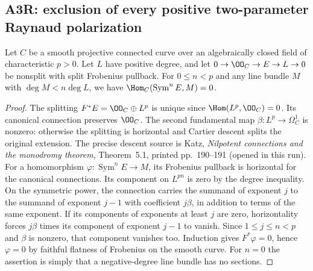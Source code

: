 \subsection{A3R: exclusion of every positive two-parameter Raynaud polarization}
\begin{lemma}\label{a:connection-bound}
Let $C$ be a smooth projective connected curve over an algebraically closed
field of characteristic $p>0$. Let $L$ have positive degree, and let
$0\to\OO_C\to E\to L\to0$ be nonsplit with split Frobenius pullback.
For $0\leq n<p$ and any line bundle $M$ with
$\deg M<n\deg L$, we have $\Hom_C(\operatorname{Sym}^n E,M)=0$.
\end{lemma}
\begin{proof}
The splitting $F^*E=\OO_C\oplus L^p$ is unique since
$\Hom(L^p,\OO_C)=0$. Its canonical connection preserves $\OO_C$.
The second fundamental map $\beta:L^p\to\Omega_C^1$ is nonzero:
otherwise the splitting is horizontal and Cartier descent splits the
original extension. The precise descent source is Katz, \emph{Nilpotent
connections and the monodromy theorem}, Theorem~5.1, printed pp.~190--191 (opened in this run).
For a homomorphism $\varphi:\operatorname{Sym}^nE\to M$, its Frobenius
pullback is horizontal for the canonical connections. Its component on
$L^{pn}$ is zero by the degree inequality. On the symmetric power, the
connection carries the summand of exponent $j$ to the summand of exponent
$j-1$ with coefficient $j\beta$, in addition to terms of the same exponent.
If its components of exponents at least $j$ are zero, horizontality forces
$j\beta$ times its component of exponent $j-1$ to vanish. Since
$1\leq j\leq n<p$ and $\beta$ is nonzero, that component vanishes too.
Induction gives $F^*\varphi=0$, hence $\varphi=0$ by faithful flatness of
Frobenius on the smooth curve. For $n=0$ the assertion is simply that a
negative-degree line bundle has no sections.
\end{proof}

